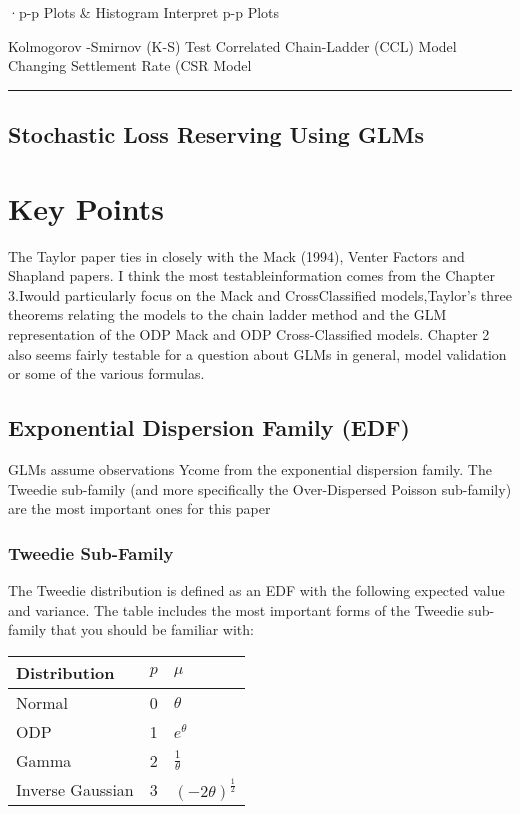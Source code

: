 \documentclass[
]{article}
\begin{document}
·p-p Plots \& Histogram Interpret p-p Plots

Kolmogorov -Smirnov (K-S) Test Correlated Chain-Ladder (CCL) Model
Changing Settlement Rate (CSR Model

\begin{center}\rule{0.5\linewidth}{0.5pt}\end{center}

\subsection{Stochastic Loss Reserving Using
GLMs}\label{stochastic-loss-reserving-using-glms}

\section{Key Points}\label{key-points}

The Taylor paper ties in closely with the Mack (1994), Venter Factors
and Shapland papers. I think the most testableinformation comes from the
Chapter 3.Iwould particularly focus on the Mack and CrossClassified
models,Taylor's three theorems relating the models to the chain ladder
method and the GLM representation of the ODP Mack and ODP
Cross-Classified models. Chapter 2 also seems fairly testable for a
question about GLMs in general, model validation or some of the various
formulas.

\subsection{Exponential Dispersion Family
(EDF)}\label{exponential-dispersion-family-edf}

GLMs assume observations Ycome from the exponential dispersion family.
The Tweedie sub-family (and more specifically the Over-Dispersed Poisson
sub-family) are the most important ones for this paper

\subsubsection{Tweedie Sub-Family}\label{tweedie-sub-family}

The Tweedie distribution is defined as an EDF with the following
expected value and variance. The table includes the most important forms
of the Tweedie sub-family that you should be familiar with:

\begin{longtable}[]{@{}lll@{}}
\toprule\noalign{}
Distribution & \(p\) & \(\mu\) \\
\midrule\noalign{}
\endhead
\bottomrule\noalign{}
\endlastfoot
Normal & 0 & \(\theta\) \\
ODP & 1 & \(e^{\theta}\) \\
Gamma & 2 & \(\frac{1}{\theta}\) \\
Inverse Gaussian & 3 & \((-2\theta)^{\frac{1}{2}}\) \\
\end{longtable}
\end{document}
